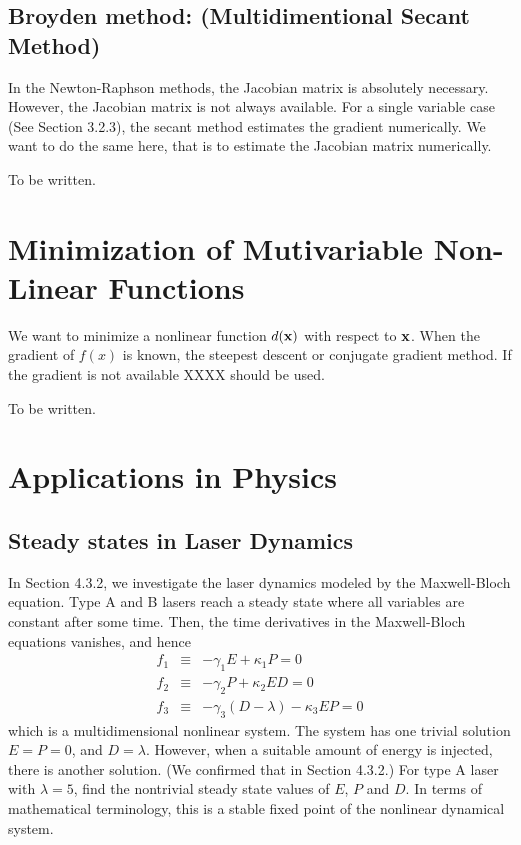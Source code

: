 \noindent
\subsection{Broyden method: (Multidimentional Secant Method)}

In the Newton-Raphson methods, the Jacobian matrix is absolutely necessary.  However, the Jacobian matrix is not always available.  For a single variable case (See Section 3.2.3), the secant method estimates the gradient numerically.  We want to do the same here, that is to estimate the Jacobian matrix numerically.

To be written.

\section{Minimization of Mutivariable Non-Linear Functions}

We want to minimize a nonlinear function $d(\vb{x})$ with respect to $\vb{x}$.  When the gradient of $f(x)$ is known, the steepest descent or conjugate gradient method. If the gradient is not available XXXX should be used.

To be written.

\section{Applications in Physics}

\subsection{Steady states in Laser Dynamics}

In Section 4.3.2, we investigate the laser dynamics modeled by the Maxwell-Bloch equation.  Type A and B lasers reach a steady state where all variables are constant after some time. Then, the time derivatives in the Maxwell-Bloch equations vanishes, and hence
\begin{subequations}
\begin{eqnarray}
f_1 &\equiv& -\gamma_1 E + \kappa_1 P = 0 \\
f_2 &\equiv& -\gamma_2 P + \kappa_2 E D = 0 \\
f_3 &\equiv& -\gamma_3 (D-\lambda) -\kappa_3 E P = 0
\end{eqnarray}
\end{subequations}
which is a multidimensional nonlinear system.  The system has one trivial solution $E=P=0$, and $D=\lambda$.  However, when a suitable amount of energy is injected, there is another solution. (We confirmed that in Section 4.3.2.)
For type A laser with $\lambda=5$, find the nontrivial steady state values of $E$, $P$ and $D$.  In terms of mathematical terminology, this is a stable fixed point of the nonlinear dynamical system.

